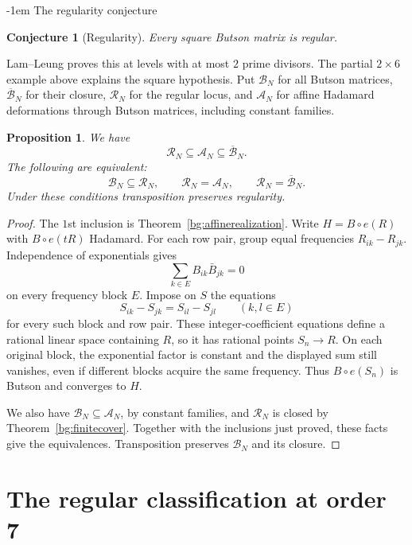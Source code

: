 \documentclass[11pt,a4paper]{article}
\makeatletter
\newtheorem{proposition}[theorem]{Proposition}
\newtheorem{conjecture}[theorem]{Conjecture}
\theoremstyle{plain}
\theoremstyle{definition}
\numberwithin{equation}{section}
\renewcommand\subsection{\@startsection{subsection}{2}{\z@}  {\medskipamount}  {-1em}  {\normalfont\normalsize\bfseries}}
\makeatother
\begin{document}
\subsection{The regularity conjecture}\label{bg:conjectures}
\begin{conjecture}[Regularity]\label{bg:regularityconjecture}
Every square Butson matrix is regular.
\end{conjecture}
Lam--Leung proves this at levels with at most $2$ prime divisors. The partial $2\times6$ example above explains the square hypothesis. Put $\mathcal B_N$ for all Butson matrices, $\overline{\mathcal B}_N$ for their closure, $\mathcal R_N$ for the regular locus, and $\mathcal A_N$ for affine Hadamard deformations through Butson matrices, including constant families.

\begin{proposition}\label{bg:affineapproximation}\label{bg:equivalentconjectures}\label{bg:transposeconditional}
We have
$$\mathcal R_N\subseteq\mathcal A_N\subseteq\overline{\mathcal B}_N.$$
The following are equivalent:
$$\mathcal B_N\subseteq\mathcal R_N,\qquad \mathcal R_N=\mathcal A_N,\qquad \mathcal R_N=\overline{\mathcal B}_N.$$
Under these conditions transposition preserves regularity.
\end{proposition}
\begin{proof}
The $1$st inclusion is Theorem~\ref{bg:affinerealization}. Write $H=B\circ e(R)$ with $B\circ e(tR)$ Hadamard. For each row pair, group equal frequencies $R_{ik}-R_{jk}$. Independence of exponentials gives
$$\sum_{k\in E}B_{ik}\bar{B}_{jk}=0$$
on every frequency block $E$. Impose on $S$ the equations
$$S_{ik}-S_{jk}=S_{il}-S_{jl}\qquad(k,l\in E)$$
for every such block and row pair. These integer-coefficient equations define a rational linear space containing $R$, so it has rational points $S_n\to R$. On each original block, the exponential factor is constant and the displayed sum still vanishes, even if different blocks acquire the same frequency. Thus $B\circ e(S_n)$ is Butson and converges to $H$.

We also have $\mathcal B_N\subseteq\mathcal A_N$, by constant families, and $\mathcal R_N$ is closed by Theorem~\ref{bg:finitecover}. Together with the inclusions just proved, these facts give the equivalences. Transposition preserves $\mathcal B_N$ and its closure.
\end{proof}


\section{The regular classification at order 7}
\end{document}
